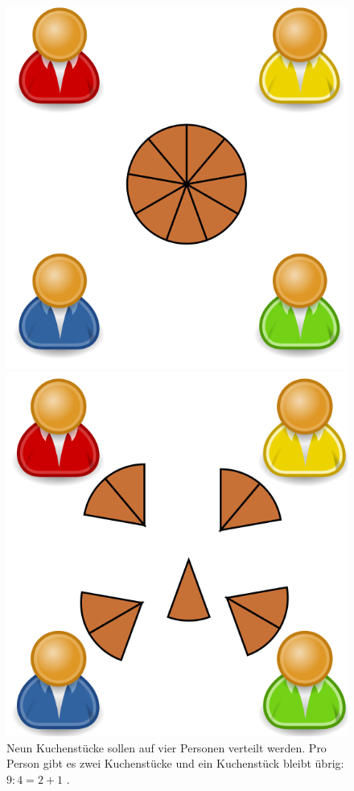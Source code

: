 \begin{example}
\begin{figure}[htb]
	\centering
	\begin{minipage}{0.45\textwidth}
		\centering
		\includegraphics[scale=0.215]{pie_division_1}		
	\end{minipage}
	\hfill
	\begin{minipage}{0.45\textwidth}
		\centering
		\includegraphics[scale=0.215]{pie_division_2}		
	\end{minipage}
	\caption{Neun Kuchenstücke sollen auf vier Personen verteilt werden. Pro Person gibt es zwei Kuchenstücke und ein Kuchenstück bleibt übrig: $9 : 4 = 2 + 1$ \cite{wiki2012piedivision}.}
	\label{figure-ganzzahlige-division-kuchen}
\end{figure}


\end{example}
